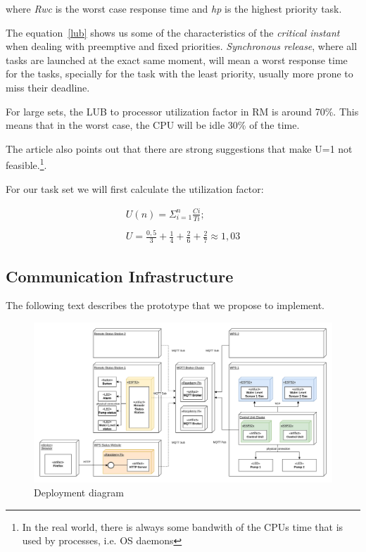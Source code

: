 \documentclass[11pt]{article}
\begin{document}
{\small where \emph{Rwc} is the worst case response time and \emph{hp} is the highest priority task.}
\medskip
\medskip

The equation~\ref{lub} shows us some of the characteristics of the \emph{critical instant} when dealing with preemptive and fixed priorities. \emph {Synchronous release}, where all tasks are launched at the exact same moment, will mean a worst response time for the tasks, specially for the task with the least priority, usually more prone to miss their deadline.

For large sets, the LUB to processor utilization factor in RM is around 70\%. This means that in the worst case, the CPU will be idle 30\% of the time.

The article also points out that there are strong suggestions that make U=1 not feasible.\footnote{In the real world, there is always some bandwith of the CPUs time that is used by processes, i.e. OS daemons}. 


For our task set  we will first calculate the utilization factor:

\begin{equation} 
\begin{split}
	U(n) = \Sigma_{i=1}^n \frac{Ci}{Ti} ; \\
	\\
	U = \frac{0,5}{3} + \frac{1}{4} + \frac{2}{6} + \frac{2}{7} \approx 1,03
\end{split}
\end{equation}

\newpage
\subsection{Communication Infrastructure}

The following text describes the prototype that we propose to implement. 

\begin{figure}[H]
  \centering
  \includegraphics[width=\linewidth]{../diagrams/deployment-diagram-WPS.jpg}
  \caption{Deployment diagram}
  \label{fig:Deployment Diagram}
\end{figure}
\end{document}
